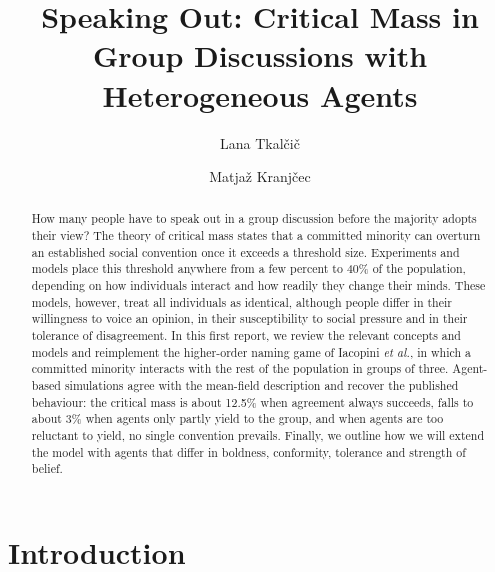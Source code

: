 \documentclass[9pt,twoside]{pnas-new}
\begin{document}
\title{Speaking Out: Critical Mass in Group Discussions with Heterogeneous Agents}

\author[a]{Lana Tkalčič}
\author[a]{Matjaž Kranjčec}




\begin{abstract}
How many people have to speak out in a group discussion before the majority adopts their view? The theory of critical mass states that a committed minority can overturn an established social convention once it exceeds a threshold size. Experiments and models place this threshold anywhere from a few percent to 40\% of the population, depending on how individuals interact and how readily they change their minds. These models, however, treat all individuals as identical, although people differ in their willingness to voice an opinion, in their susceptibility to social pressure and in their tolerance of disagreement. In this first report, we review the relevant concepts and models and reimplement the higher-order naming game of Iacopini \emph{et al.}, in which a committed minority interacts with the rest of the population in groups of three. Agent-based simulations agree with the mean-field description and recover the published behaviour: the critical mass is about 12.5\% when agreement always succeeds, falls to about 3\% when agents only partly yield to the group, and when agents are too reluctant to yield, no single convention prevails. Finally, we outline how we will extend the model with agents that differ in boldness, conformity, tolerance and strength of belief.
\end{abstract}

\maketitle
{}

\section{Introduction}
\end{document}
